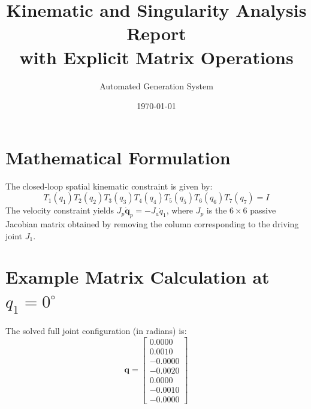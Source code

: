 \documentclass[12pt,a4paper]{article}
\title{\textbf{Kinematic and Singularity Analysis Report \\ with Explicit Matrix Operations}}
\author{Automated Generation System}
\date{\today}
\begin{document}
\maketitle

\section{Mathematical Formulation}
The closed-loop spatial kinematic constraint is given by:
\begin{equation}
    T_1(q_1) T_2(q_2) T_3(q_3) T_4(q_4) T_5(q_5) T_6(q_6) T_7(q_7) = I
\end{equation}
The velocity constraint yields $J_p \dot{\mathbf{q}}_p = - J_a \dot{q}_1$, where $J_p$ is the $6 \times 6$ passive Jacobian matrix obtained by removing the column corresponding to the driving joint $J_1$.

\section{Example Matrix Calculation at $q_1 = 0^\circ$}
The solved full joint configuration (in radians) is:
\begin{equation}
    \mathbf{q} = \begin{bmatrix} 0.0000 \\ 0.0010 \\ -0.0000 \\ -0.0020 \\ 0.0000 \\ -0.0010 \\ -0.0000 \end{bmatrix}
\end{equation}
\end{document}
